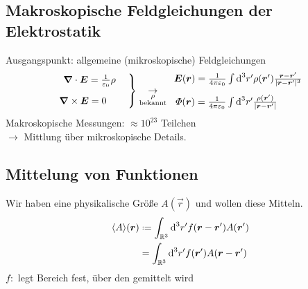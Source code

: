 \subsection{Makroskopische Feldgleichungen der Elektrostatik}

Ausgangspunkt: allgemeine (mikroskopische) Feldgleichungen
\begin{equation*}
\left.\begin{array}{c}
\bm{\nabla} \cdot \bm{E} = \frac{1}{\varepsilon_0} \rho \ \\[10pt]
\bm{\nabla} \times \bm{E} = 0 \quad \ \, \: 
\end{array}\right\} \underset{\substack{\rho \\ \textrm{bekannt}}}{\rightarrow} \begin{array}{l}
\bm{E}(\bm{r}) = \frac{1}{4\pi\varepsilon_0} \int \textrm{d} ^3 r' \rho(\bm{r}') \frac{\bm{r} - \bm{r}'}{|\bm{r} - \bm{r}'|^3} \\[10pt]
\, \varPhi(\bm{r}) = \frac{1}{4\pi\varepsilon_0} \int \textrm{d} ^3 r' \frac{\rho(\bm{r}')}{|\bm{r} - \bm{r}'|}
\end{array}
\end{equation*}
Makroskopische Messungen: $ \approx 10^{23} $ Teilchen\\
$ \rightarrow $ Mittlung über mikroskopische Details.

\subsection{Mittelung von Funktionen}

Wir haben eine physikalische Größe $ A(\vec{r}) $ und wollen diese Mitteln.
\begin{align*}
\langle A \rangle (\vec{r}) &\defeq \int_{\mathbb{R}^3} \dd ^3 r' f(\vec{r} - \vec{r}') A(\vec{r}') \\
&= \int_{\mathbb{R}^3} \dd^3 r' f(\vec{r}') A(\vec{r} - \vec{r}')
\end{align*}
$ f : $ legt Bereich fest, über den gemittelt wird

